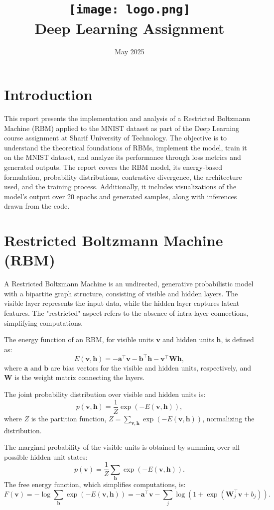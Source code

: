 \documentclass{article}
\title{
    \texttt{[image: logo.png]} \\
    Deep Learning Assignment \\ \exerciseset
}
\author{\FirstAuthor}
\date{May 2025}
\begin{document}
\maketitle

\section*{Introduction}
This report presents the implementation and analysis of a Restricted Boltzmann Machine (RBM) applied to the MNIST dataset as part of the Deep Learning course assignment at Sharif University of Technology. The objective is to understand the theoretical foundations of RBMs, implement the model, train it on the MNIST dataset, and analyze its performance through loss metrics and generated outputs. The report covers the RBM model, its energy-based formulation, probability distributions, contrastive divergence, the architecture used, and the training process. Additionally, it includes visualizations of the model's output over 20 epochs and generated samples, along with inferences drawn from the code.

\section{Restricted Boltzmann Machine (RBM)}
A Restricted Boltzmann Machine is an undirected, generative probabilistic model with a bipartite graph structure, consisting of visible and hidden layers. The visible layer represents the input data, while the hidden layer captures latent features. The "restricted" aspect refers to the absence of intra-layer connections, simplifying computations.

The energy function of an RBM, for visible units \( \mathbf{v} \) and hidden units \( \mathbf{h} \), is defined as:
\[
E(\mathbf{v}, \mathbf{h}) = -\mathbf{a}^\top \mathbf{v} - \mathbf{b}^\top \mathbf{h} - \mathbf{v}^\top \mathbf{W} \mathbf{h},
\]
where \( \mathbf{a} \) and \( \mathbf{b} \) are bias vectors for the visible and hidden units, respectively, and \( \mathbf{W} \) is the weight matrix connecting the layers.

The joint probability distribution over visible and hidden units is:
\[
p(\mathbf{v}, \mathbf{h}) = \frac{1}{Z} \exp(-E(\mathbf{v}, \mathbf{h})),
\]
where \( Z \) is the partition function, \( Z = \sum_{\mathbf{v}, \mathbf{h}} \exp(-E(\mathbf{v}, \mathbf{h})) \), normalizing the distribution.

The marginal probability of the visible units is obtained by summing over all possible hidden unit states:
\[
p(\mathbf{v}) = \frac{1}{Z} \sum_{\mathbf{h}} \exp(-E(\mathbf{v}, \mathbf{h})).
\]
The free energy function, which simplifies computations, is:
\[
F(\mathbf{v}) = -\log \sum_{\mathbf{h}} \exp(-E(\mathbf{v}, \mathbf{h})) = -\mathbf{a}^\top \mathbf{v} - \sum_j \log(1 + \exp(\mathbf{W}_j^\top \mathbf{v} + b_j)).
\]
\end{document}
